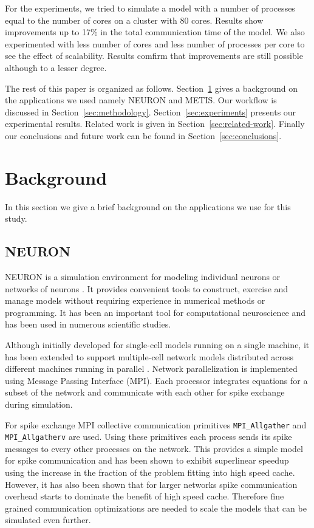 \documentclass{article}
\begin{document}
For the experiments, we tried to simulate a model with a number of processes equal to the number of cores on a cluster with 80 cores.
Results show improvements up to 17\% in the total communication time of the model.
We also experimented with less number of cores and less number of processes per core to see the effect of scalability.
Results comfirm that improvements are still possible although to a lesser degree.

The rest of this paper is organized as follows.
Section~\ref{sec:background} gives a background on the applications we used namely NEURON and METIS.
Our workflow is discussed in Section~\ref{sec:methodology}.
Section~\ref{sec:experiments} presents our experimental results.
Related work is given in Section~\ref{sec:related-work}.
Finally our conclusions and future work can be found in Section~\ref{sec:conclusions}.

\section{Background}
\label{sec:background}

In this section we give a brief background on the applications we use for this study.

\subsection{NEURON}

NEURON is a simulation environment for modeling individual neurons or networks of neurons \cite{hines_neuron_1997}.
It provides convenient tools to construct, exercise and manage models without requiring experience in numerical methods or programming.
It has been an important tool for computational neuroscience and has been used in numerous scientific studies.

Although initially developed for single-cell models running on a single machine, it has been extended to support multiple-cell network models distributed across different machines running in parallel \cite{migliore_parallel_2006}.
Network parallelization is implemented using Message Passing Interface (MPI).
Each processor integrates equations for a subset of the network and communicate with each other for spike exchange during simulation.

For spike exchange MPI collective communication primitives \texttt{MPI\_Allgather} and \texttt{MPI\_Allgatherv} are used.
Using these primitives each process sends its spike messages to every other processes on the network.
This provides a simple model for spike communication and has been shown to exhibit superlinear speedup using the increase in the fraction of the problem fitting into high speed cache.
However, it has also been shown that for larger networks spike communication overhead starts to dominate the benefit of high speed cache.
Therefore fine grained communication optimizations are needed to scale the models that can be simulated even further.
\end{document}
